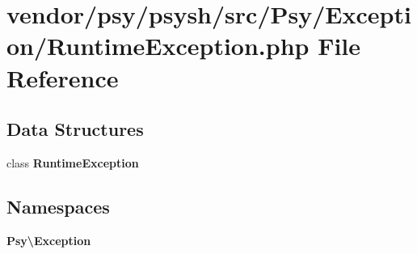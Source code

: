 \section{vendor/psy/psysh/src/\+Psy/\+Exception/\+Runtime\+Exception.php File Reference}
\label{psy_2psysh_2src_2_psy_2_exception_2_runtime_exception_8php}
\subsection*{Data Structures}
\begin{DoxyCompactItemize}
\item 
class {\bf Runtime\+Exception}
\end{DoxyCompactItemize}
\subsection*{Namespaces}
\begin{DoxyCompactItemize}
\item 
 {\bf Psy\textbackslash{}\+Exception}
\end{DoxyCompactItemize}
